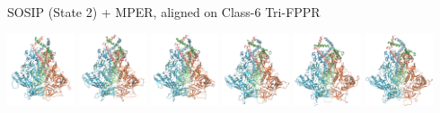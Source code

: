 \begin{frame}[fragile]{SOSIP (State 2) + MPER, aligned on Class-6 Tri-FPPR}

    \includegraphics[width=0.149\textwidth]{ppt/media/image5.png}
    \includegraphics[width=0.149\textwidth]{ppt/media/image6.png}
    \includegraphics[width=0.149\textwidth]{ppt/media/image7.png}
    \includegraphics[width=0.149\textwidth]{ppt/media/image8.png}
    \includegraphics[width=0.149\textwidth]{ppt/media/image9.png}
    \includegraphics[width=0.149\textwidth]{ppt/media/image11.png}


\end{frame}
